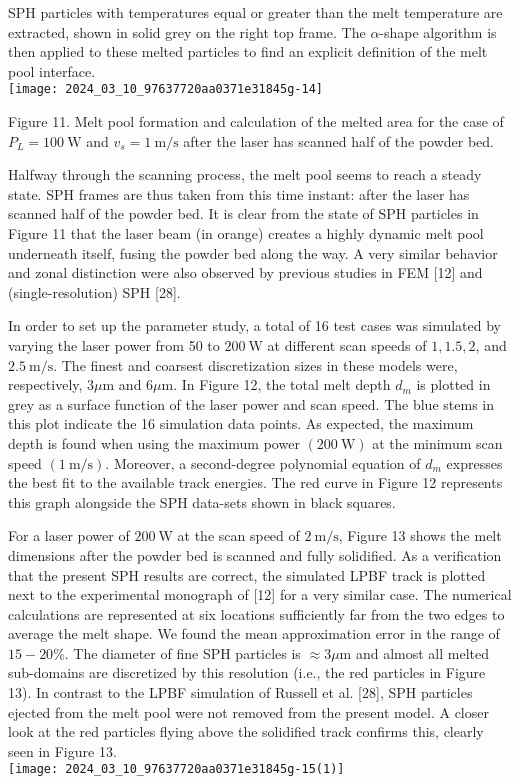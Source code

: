 \documentclass[10pt]{article}
\begin{document}
SPH particles with temperatures equal or greater than the melt temperature are extracted, shown in solid grey on the right top frame. The $\alpha$-shape algorithm is then applied to these melted particles to find an explicit definition of the melt pool interface.\\
\texttt{[image: 2024\_03\_10\_97637720aa0371e31845g-14]}

Figure 11. Melt pool formation and calculation of the melted area for the case of $P_{L}=100 \mathrm{~W}$ and $v_{s}=1 \mathrm{~m} / \mathrm{s}$ after the laser has scanned half of the powder bed.

Halfway through the scanning process, the melt pool seems to reach a steady state. SPH frames are thus taken from this time instant: after the laser has scanned half of the powder bed. It is clear from the state of SPH particles in Figure 11 that the laser beam (in orange) creates a highly dynamic melt pool underneath itself, fusing the powder bed along the way. A very similar behavior and zonal distinction were also observed by previous studies in FEM [12] and (single-resolution) SPH [28].

In order to set up the parameter study, a total of 16 test cases was simulated by varying the laser power from 50 to $200 \mathrm{~W}$ at different scan speeds of $1,1.5,2$, and $2.5 \mathrm{~m} / \mathrm{s}$. The finest and coarsest discretization sizes in these models were, respectively, $3 \mu \mathrm{m}$ and $6 \mu \mathrm{m}$. In Figure 12, the total melt depth $d_{m}$ is plotted in grey as a surface function of the laser power and scan speed. The blue stems in this plot indicate the 16 simulation data points. As expected, the maximum depth is found when using the maximum power $(200 \mathrm{~W})$ at the minimum scan speed $(1 \mathrm{~m} / \mathrm{s})$. Moreover, a second-degree polynomial equation of $d_{m}$ expresses the best fit to the available track energies. The red curve in Figure 12 represents this graph alongside the SPH data-sets shown in black squares.

For a laser power of $200 \mathrm{~W}$ at the scan speed of $2 \mathrm{~m} / \mathrm{s}$, Figure 13 shows the melt dimensions after the powder bed is scanned and fully solidified. As a verification that the present SPH results are correct, the simulated LPBF track is plotted next to the experimental monograph of [12] for a very similar case. The numerical calculations are represented at six locations sufficiently far from the two edges to average the melt shape. We found the mean approximation error in the range of $15-20 \%$. The diameter of fine SPH particles is $\approx 3 \mu \mathrm{m}$ and almost all melted sub-domains are discretized by this resolution (i.e., the red particles in Figure 13). In contrast to the LPBF simulation of Russell et al. [28], SPH particles ejected from the melt pool were not removed from the present model. A closer look at the red particles flying above the solidified track confirms this, clearly seen in Figure 13.\\
\texttt{[image: 2024\_03\_10\_97637720aa0371e31845g-15(1)]}
\end{document}
